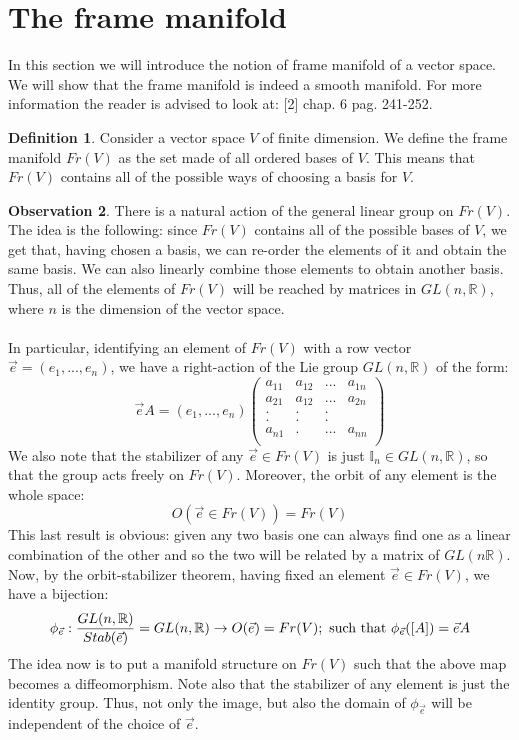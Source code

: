 \documentclass[12pt,a4paper]{report}
\theoremstyle{definition}
\newtheorem{Def}{Definition}[chapter]
\theoremstyle{Theorem}
\theoremstyle{definition}
\theoremstyle{definition}
\newtheorem{Obs}[Def]{Observation}
\begin{document}
	\section{The frame manifold}
	In this section we will introduce the notion of frame manifold of a vector space. We will show that the frame manifold is indeed a smooth manifold. For more information the reader is advised to look at: [2] chap. 6 pag. 241-252.
	\begin{Def}\label{Def_6.5}
		Consider a vector space $V$ of finite dimension. We define the frame manifold $Fr(V)$ as the set made of all ordered bases of $V$. This means that $Fr(V)$ contains all of the possible ways of choosing a basis for $V$.
	\end{Def}
	\begin{Obs}
		There is a natural action of the general linear group on $Fr(V)$. The idea is the following: since $Fr(V)$ contains all of the possible bases of $V$, we get that, having chosen a basis, we can re-order the elements of it and obtain the same basis. We can also linearly combine those elements to obtain another basis. Thus, all of the elements of $Fr(V)$ will be reached by matrices in $GL(n,\mathbb{R})$, where $n$ is the dimension of the vector space.\\
		\\
		In particular, identifying an element of $Fr(V)$ with a row vector $\vec{e}=(e_1,...,e_n)$, we have a right-action of the Lie group $GL(n,\mathbb{R})$ of the form:
		$$\vec{e}A=(e_1,...,e_n)\begin{pmatrix}
			a_{11}&a_{12}&...&a_{1n}\\
			a_{21}&a_{12}&...&a_{2n}\\
			.     &.     &.   &     \\
			.     &.     &.   &     \\
			a_{n1}&.     &...&a_{nn}\\
		\end{pmatrix}$$
		We also note that the stabilizer of any $\vec{e}\in Fr(V)$ is just $\mathbb{I}_n\in GL(n,\mathbb{R})$, so that the group acts freely on $Fr(V)$. Moreover, the orbit of any element is the whole space: 
		$$O(\vec{e}\in Fr(V))=Fr(V)$$
		This last result is obvious: given any two basis one can always find one as a linear combination of the other and so the two will be related by a matrix of $GL(n\mathbb{R})$.
		Now, by the orbit-stabilizer theorem, having fixed an element $\vec{e}\in Fr(V)$, we have a bijection:
		$$\phi_{\vec{e}}:{GL(n,\mathbb{R})\over Stab(\vec{e})}=GL(n,\mathbb{R})\rightarrow O(\vec{e})=Fr(V);\hbox{ such that } \phi_{\vec{e}}([A])=\vec{e}A$$
		The idea now is to put a manifold structure on $Fr(V)$ such that the above map becomes a diffeomorphism. Note also that the stabilizer of any element is just the identity group. Thus, not only the image, but also the domain of $\phi_{\vec{e}}$ will be independent of the choice of $\vec{e}$.
	\end{Obs}
\end{document}
